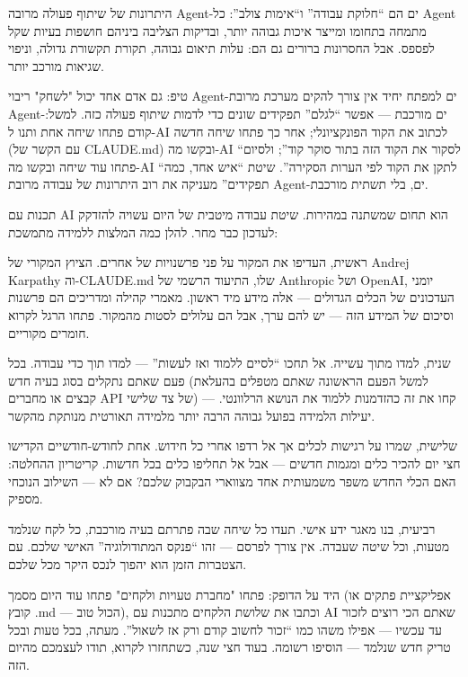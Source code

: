 היתרונות של שיתוף פעולה מרובה Agent-ים הם “חלוקת עבודה” ו“אימות צולב”: כל Agent מתמחה בתחומו ומייצר איכות גבוהה יותר, ובדיקות הצליבה ביניהם חושפות בעיות שקל לפספס. אבל החסרונות ברורים גם הם: עלות תיאום גבוהה, תקורת תקשורת גדולה, וניפוי שגיאות מורכב יותר.

\begin{tcbinfo}{טיפ: גם אדם אחד יכול "לשחק" ריבוי Agent-ים}
למפתח יחיד אין צורך להקים מערכת מרובת Agent-ים מורכבת — אפשר “לגלם” תפקידים שונים כדי לדמות שיתוף פעולה כזה. למשל: קודם פתחו שיחה אחת ותנו ל-AI לכתוב את הקוד הפונקציונלי; אחר כך פתחו שיחה חדשה (עם הקשר של CLAUDE.md) ובקשו מה-AI “לסקור את הקוד הזה בתור סוקר קוד”; ולסיום פתחו עוד שיחה ובקשו מה-AI “לתקן את הקוד לפי הערות הסקירה”. שיטת “איש אחד, כמה תפקידים” מעניקה את רוב היתרונות של עבודה מרובת Agent-ים, בלי תשתית מורכבת.

\end{tcbinfo}


תכנות עם AI הוא תחום שמשתנה במהירות. שיטת עבודה מיטבית של היום עשויה להזדקק לעדכון כבר מחר. להלן כמה המלצות ללמידה מתמשכת:

ראשית, העדיפו את המקור על פני פרשנויות של אחרים. הציוץ המקורי של Andrej Karpathy וה-CLAUDE.md שלו, התיעוד הרשמי של Anthropic ושל OpenAI, יומני העדכונים של הכלים הגדולים — אלה מידע מיד ראשון. מאמרי קהילה ומדריכים הם פרשנות וסיכום של המידע הזה — יש להם ערך, אבל הם עלולים לסטות מהמקור. פתחו הרגל לקרוא חומרים מקוריים.

שנית, למדו מתוך עשייה. אל תחכו “לסיים ללמוד ואז לעשות” — למדו תוך כדי עבודה. בכל פעם שאתם נתקלים בסוג בעיה חדש (למשל הפעם הראשונה שאתם מטפלים בהעלאת קבצים או מחברים API של צד שלישי) — קחו את זה כהזדמנות ללמוד את הנושא הרלוונטי. יעילות הלמידה בפועל גבוהה הרבה יותר מלמידה תאורטית מנותקת מהקשר.

שלישית, שמרו על רגישות לכלים אך אל רדפו אחרי כל חידוש. אחת לחודש-חודשיים הקדישו חצי יום להכיר כלים ומגמות חדשים — אבל אל תחליפו כלים בכל חדשות. קריטריון ההחלטה: האם הכלי החדש משפר משמעותית אחד מצווארי הבקבוק שלכם? אם לא — השילוב הנוכחי מספיק.

רביעית, בנו מאגר ידע אישי. תעדו כל שיחה שבה פתרתם בעיה מורכבת, כל לקח שנלמד מטעות, וכל שיטה שעבדה. אין צורך לפרסם — זהו “פנקס המתודולוגיה” האישי שלכם. עם הצטברות הזמן הוא יהפוך לנכס היקר מכל שלכם.

\begin{tcbpractice}{היד על הדופק: פתחו "מחברת טעויות ולקחים"}
פתחו עוד היום מסמך (אפליקציית פתקים או קובץ .md — הכול טוב), וכתבו את שלושת הלקחים מתכנות עם AI שאתם הכי רוצים לזכור עד עכשיו — אפילו משהו כמו “זכור לחשוב קודם ורק אז לשאול”. מעתה, בכל טעות ובכל טריק חדש שנלמד — הוסיפו רשומה. בעוד חצי שנה, כשתחזרו לקרוא, תודו לעצמכם מהיום הזה.

\end{tcbpractice}

